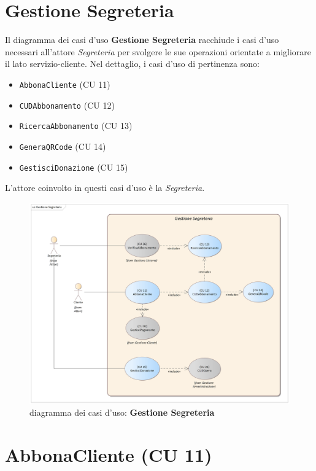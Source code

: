 \documentclass{article}
\begin{document}
\newpage

\section{Gestione Segreteria}

\indent\indent Il diagramma dei casi d'uso \textbf{Gestione Segreteria} racchiude i casi d'uso necessari all'attore \emph{Segreteria} per svolgere le sue operazioni orientate a migliorare il lato servizio-cliente. Nel dettaglio, i casi d'uso di pertinenza sono:
\medskip
\begin{itemize}[itemsep=4pt]
  \item \texttt{AbbonaCliente} (CU 11)
  \item \texttt{CUDAbbonamento} (CU 12)
  \item \texttt{RicercaAbbonamento} (CU 13)
  \item \texttt{GeneraQRCode} (CU 14)
  \item \texttt{GestisciDonazione} (CU 15)
\end{itemize}
\medskip
L'attore coinvolto in questi casi d'uso è la \emph{Segreteria}.

\begin{figure}[h]
    \centering
    \includegraphics[width=1\textwidth]{Gestione Segreteria}
    \caption{diagramma dei casi d'uso: \textbf{Gestione Segreteria}}
    \label{fig:GestioneSegreteria}
\end{figure}





\newpage
\section*{AbbonaCliente (CU 11)}
	
\end{document}
